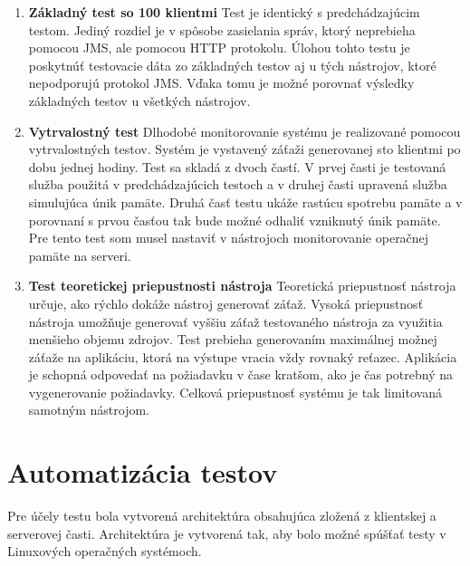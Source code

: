 \documentclass[12pt,oneside,final]{fithesis-utf8}
\begin{document}
\begin{enumerate}
\item \textbf{Základný test so 100 klientmi}
\newline
Test je identický s predchádzajúcim testom. Jediný rozdiel je v spôsobe zasielania správ, ktorý neprebieha pomocou JMS, ale pomocou HTTP protokolu. Úlohou tohto testu je poskytnúť testovacie dáta zo základných testov aj u tých nástrojov, ktoré nepodporujú protokol JMS. Vďaka tomu je možné porovnať výsledky základných testov u všetkých nástrojov.
\newline

\item \textbf{Vytrvalostný test}
\newline
Dlhodobé monitorovanie systému je realizované pomocou vytrvalostných testov. Systém je vystavený záťaži generovanej sto klientmi po dobu jednej hodiny. Test sa skladá z dvoch častí. V prvej časti je testovaná služba použitá v predchádzajúcich testoch a v druhej časti upravená služba simulujúca únik pamäte. Druhá časť testu ukáže rastúcu spotrebu pamäte a v porovnaní s prvou časťou tak bude možné odhaliť vzniknutý únik pamäte. Pre tento test som musel nastaviť v nástrojoch monitorovanie operačnej pamäte na serveri.
\newline

\item \textbf{Test teoretickej priepustnosti nástroja}
\newline
Teoretická priepustnosť nástroja určuje, ako rýchlo dokáže nástroj generovať záťaž. Vysoká priepustnosť nástroja umožňuje generovať vyššiu záťaž testovaného nástroja za využitia menšieho objemu zdrojov. Test prebieha generovaním maximálnej možnej záťaže na aplikáciu, ktorá na výstupe vracia vždy rovnaký reťazec. Aplikácia je schopná odpovedať na požiadavku v čase kratšom, ako je čas potrebný na vygenerovanie požiadavky. Celková priepustnosť systému je tak limitovaná samotným nástrojom.

\end{enumerate}

\newpage
\section{Automatizácia testov}
Pre účely testu bola vytvorená architektúra obsahujúca zložená z klientskej a serverovej časti. Architektúra je vytvorená tak, aby bolo možné spúšťať testy v Linuxových operačných systémoch.
\end{document}
